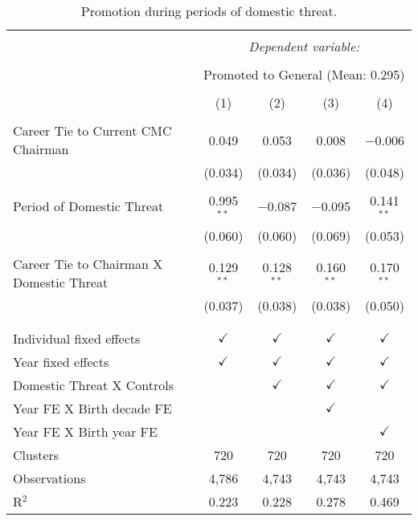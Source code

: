 
\begin{table}[!htbp] \centering 
  \caption{Promotion during periods of domestic threat.} 
  \label{domestic_threat} 
\begin{tabular}{@{\extracolsep{5pt}}lcccc} 
\\[-1.8ex]\hline 
\hline \\[-1.8ex] 
 & \multicolumn{4}{c}{\textit{Dependent variable:}} \\ 
\cline{2-5} 
\\[-1.8ex] & \multicolumn{4}{c}{Promoted to General (Mean: 0.295)} \\ 
\\[-1.8ex] & (1) & (2) & (3) & (4)\\ 
\hline \\[-1.8ex] 
 Career Tie to Current CMC Chairman & 0.049 & 0.053 & 0.008 & $-$0.006 \\ 
  & (0.034) & (0.034) & (0.036) & (0.048) \\ 
  & & & & \\ 
 Period of Domestic Threat & 0.995$^{**}$ & $-$0.087 & $-$0.095 & 0.141$^{**}$ \\ 
  & (0.060) & (0.060) & (0.069) & (0.053) \\ 
  & & & & \\ 
 Career Tie to Chairman X Domestic Threat & 0.129$^{**}$ & 0.128$^{**}$ & 0.160$^{**}$ & 0.170$^{**}$ \\ 
  & (0.037) & (0.038) & (0.038) & (0.050) \\ 
  & & & & \\ 
\hline \\[-1.8ex] 
Individual fixed effects & $\checkmark$ & $\checkmark$ & $\checkmark$ & $\checkmark$ \\ 
Year fixed effects & $\checkmark$ & $\checkmark$ & $\checkmark$ & $\checkmark$ \\ 
Domestic Threat X Controls &  & $\checkmark$ & $\checkmark$ & $\checkmark$ \\ 
Year FE X Birth decade FE &  &  & $\checkmark$ &  \\ 
Year FE X Birth year FE &  &  &  & $\checkmark$ \\ 
Clusters & 720 & 720 & 720 & 720 \\ 
Observations & 4,786 & 4,743 & 4,743 & 4,743 \\ 
R$^{2}$ & 0.223 & 0.228 & 0.278 & 0.469 \\ 

\end{tabular}
\end{table}
